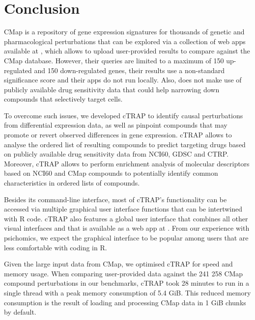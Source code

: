\section{Conclusion}


CMap is a repository of gene expression signatures for thousands of genetic and pharmacological perturbations that can be explored via a collection of web apps available at , which allows to upload user-provided results to compare against the CMap database. However, their queries are limited to a maximum of 150 up-regulated and 150 down-regulated genes, their results use a non-standard significance score and their apps do not run locally. Also,  does not make use of publicly available drug sensitivity data that could help narrowing down compounds that selectively target cells.

To overcome such issues, we developed cTRAP to identify causal perturbations from differential expression data, as well as pinpoint compounds that may promote or revert observed differences in gene expression. cTRAP allows to analyse the ordered list of resulting compounds to predict targeting drugs based on publicly available drug sensitivity data from NCI60, GDSC and CTRP. Moreover, cTRAP allows to perform enrichment analysis of molecular descriptors based on NCI60 and CMap compounds to potentially identify common characteristics in ordered lists of compounds.

Besides its command-line interface, most of cTRAP's functionality can be accessed via multiple graphical user interface functions that can be intertwined with R code. cTRAP also features a global user interface that combines all other visual interfaces and that is available as a web app at . From our experience with psichomics, we expect the graphical interface to be popular among users that are less comfortable with coding in R.

Given the large input data from CMap, we optimised cTRAP for speed and memory usage. When comparing user-provided data against the 241 258 CMap compound perturbations in our benchmarks, cTRAP took 28 minutes to run in a single thread with a peak memory consumption of 5.4 GiB. This reduced memory consumption is the result of loading and processing CMap data in 1 GiB chunks by default.

